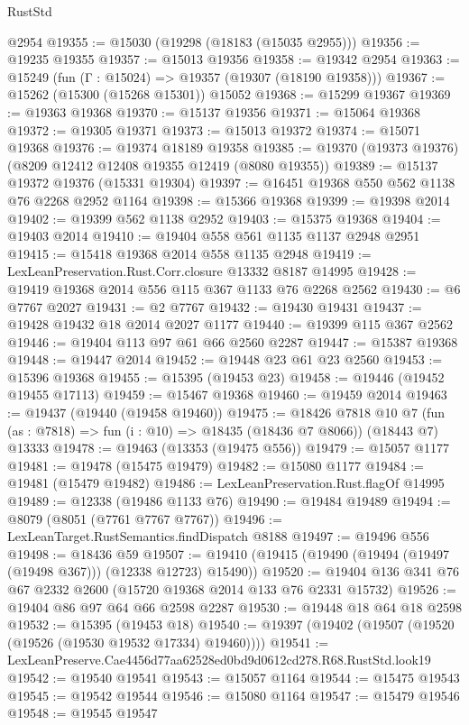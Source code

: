 \begin{lexlean}{RustStd}
\begin{coremodule}
    @2954
@19355 := @15030 (@19298 (@18183 (@15035 @2955)))
@19356 := @19235 @19355
@19357 := @15013 @19356
@19358 := @19342 @2954
@19363 := @15249 (fun (Γ : @15024) => @19357 (@19307 (@18190 @19358)))
@19367 := @15262 (@15300 (@15268 @15301)) @15052
@19368 := @15299 @19367
@19369 := @19363 @19368
@19370 := @15137 @19356
@19371 := @15064 @19368
@19372 := @19305 @19371
@19373 := @15013 @19372
@19374 := @15071 @19368
@19376 := @19374 @18189 @19358
@19385 := @19370 (@19373 @19376) (@8209 @12412 @12408 @19355 @12419 (@8080 @19355))
@19389 := @15137 @19372 @19376 (@15331 @19304)
@19397 := @16451 @19368 @550 @562 @1138 @76 @2268 @2952 @1164
@19398 := @15366 @19368
@19399 := @19398 @2014
@19402 := @19399 @562 @1138 @2952
@19403 := @15375 @19368
@19404 := @19403 @2014
@19410 := @19404 @558 @561 @1135 @1137 @2948 @2951
@19415 := @15418 @19368 @2014 @558 @1135 @2948
@19419 := LexLeanPreservation.Rust.Corr.closure @13332 @8187 @14995
@19428 := @19419 @19368 @2014 @556 @115 @367 @1133 @76 @2268 @2562
@19430 := @6 @7767 @2027
@19431 := @2 @7767
@19432 := @19430 @19431
@19437 := @19428 @19432 @18 @2014 @2027 @1177
@19440 := @19399 @115 @367 @2562
@19446 := @19404 @113 @97 @61 @66 @2560 @2287
@19447 := @15387 @19368
@19448 := @19447 @2014
@19452 := @19448 @23 @61 @23 @2560
@19453 := @15396 @19368
@19455 := @15395 (@19453 @23)
@19458 := @19446 (@19452 @19455 @17113)
@19459 := @15467 @19368
@19460 := @19459 @2014
@19463 := @19437 (@19440 (@19458 @19460))
@19475 := @18426
    @7818
    @10
    @7
    (fun (as : @7818) => fun (i : @10) => @18435 (@18436 @7 @8066))
    (@18443 @7)
    @13333
@19478 := @19463 (@13353 (@19475 @556))
@19479 := @15057 @1177
@19481 := @19478 (@15475 @19479)
@19482 := @15080 @1177
@19484 := @19481 (@15479 @19482)
@19486 := LexLeanPreservation.Rust.flagOf @14995
@19489 := @12338 (@19486 @1133 @76)
@19490 := @19484 @19489
@19494 := @8079 (@8051 (@7761 @7767 @7767))
@19496 := LexLeanTarget.RustSemantics.findDispatch @8188
@19497 := @19496 @556
@19498 := @18436 @59
@19507 := @19410 (@19415 (@19490 (@19494 (@19497 (@19498 @367))) (@12338 @12723) @15490))
@19520 := @19404 @136 @341 @76 @67 @2332 @2600 (@15720 @19368 @2014 @133 @76 @2331 @15732)
@19526 := @19404 @86 @97 @64 @66 @2598 @2287
@19530 := @19448 @18 @64 @18 @2598
@19532 := @15395 (@19453 @18)
@19540 := @19397 (@19402 (@19507 (@19520 (@19526 (@19530 @19532 @17334) @19460))))
@19541 := LexLeanPreserve.Cae4456d77aa62528ed0bd9d0612cd278.R68.RustStd.look19
@19542 := @19540 @19541
@19543 := @15057 @1164
@19544 := @15475 @19543
@19545 := @19542 @19544
@19546 := @15080 @1164
@19547 := @15479 @19546
@19548 := @19545 @19547

\end{coremodule}
\end{lexlean}
